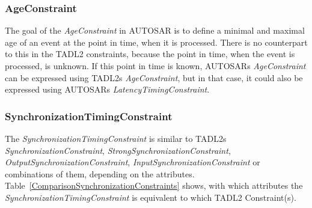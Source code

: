 	\subsubsection{AgeConstraint}
		The goal of the \emph{AgeConstraint} in AUTOSAR is to define a minimal and maximal age of an event at the point in time, when it is processed. There is no counterpart to this in the TADL2 constraints, because the point in time, when the event is processed, is unknown. If this point in time is known, AUTOSARs \emph{AgeConstraint} can be expressed using TADL2s \emph{AgeConstraint}, but in that case, it could also be expressed using AUTOSARs \emph{LatencyTimingConstraint}.
		
	\subsubsection{SynchronizationTimingConstraint}
		The \emph{SynchronizationTimingConstraint} is similar to TADL2s \emph{SynchronizationConstraint}, 
		\emph{StrongSynchronizationConstraint}, \emph{OutputSynchronizationConstraint}, \emph{InputSynchronizationConstraint} or combinations of them, depending on the attributes. Table~\ref{ComparisonSynchronizationConstraints} shows, with which attributes the \emph{SynchronizationTimingConstraint} is equivalent to which TADL2 Constraint(s).
